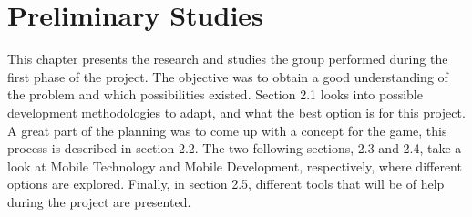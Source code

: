 \chapter{Preliminary Studies}

This chapter presents the research and studies the group performed during the first phase of 
the project. The objective was to obtain a good understanding of the problem and which 
possibilities existed. Section 2.1 looks into possible development methodologies to 
adapt, and what the best option is for this project. A great part of the planning was to 
come up with a concept for the game, this process is described in section 2.2. The two following 
sections, 2.3 and 2.4, take a look at Mobile Technology and Mobile Development, respectively, where different 
options are explored. Finally, in section 2.5, different tools that will be of help during the 
project are presented.